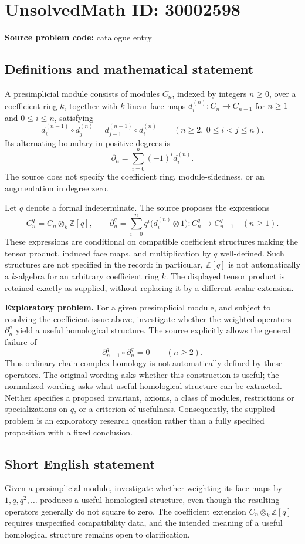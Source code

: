 \documentclass[11pt]{article}
\begin{document}
\section*{UnsolvedMath ID: 30002598}
\textbf{Source problem code:} catalogue entry
\subsection{Definitions and mathematical statement}
A presimplicial module consists of modules \(C_n\), indexed by integers \(n\geq 0\), over a coefficient ring \(k\), together with \(k\)-linear face maps \(d_i^{(n)}:C_n\to C_{n-1}\) for \(n\geq 1\) and \(0\leq i\leq n\), satisfying
\[
 d_i^{(n-1)}\circ d_j^{(n)}=d_{j-1}^{(n-1)}\circ d_i^{(n)}
 \qquad(n\geq 2,\ 0\leq i<j\leq n).
\]
Its alternating boundary in positive degrees is
\[
 \partial_n=\sum_{i=0}^{n}(-1)^i d_i^{(n)}.
\]
The source does not specify the coefficient ring, module-sidedness, or an augmentation in degree zero.

Let \(q\) denote a formal indeterminate. The source proposes the expressions
\[
 C_n^q=C_n\otimes_k\mathbb Z[q],\qquad
 \partial_n^q=\sum_{i=0}^{n}q^i\bigl(d_i^{(n)}\otimes 1\bigr):C_n^q\longrightarrow C_{n-1}^q
 \quad(n\geq 1).
\]
These expressions are conditional on compatible coefficient structures making the tensor product, induced face maps, and multiplication by \(q\) well-defined. Such structures are not specified in the record: in particular, \(\mathbb Z[q]\) is not automatically a \(k\)-algebra for an arbitrary coefficient ring \(k\). The displayed tensor product is retained exactly as supplied, without replacing it by a different scalar extension.

\textbf{Exploratory problem.} For a given presimplicial module, and subject to resolving the coefficient issue above, investigate whether the weighted operators \(\partial_n^q\) yield a useful homological structure. The source explicitly allows the general failure of
\[
 \partial_{n-1}^q\circ\partial_n^q=0\qquad(n\geq 2).
\]
Thus ordinary chain-complex homology is not automatically defined by these operators. The original wording asks whether this construction is useful; the normalized wording asks what useful homological structure can be extracted. Neither specifies a proposed invariant, axioms, a class of modules, restrictions or specializations on \(q\), or a criterion of usefulness. Consequently, the supplied problem is an exploratory research question rather than a fully specified proposition with a fixed conclusion.
\subsection{Short English statement}
Given a presimplicial module, investigate whether weighting its face maps by \(1,q,q^2,\ldots\) produces a useful homological structure, even though the resulting operators generally do not square to zero. The coefficient extension \(C_n\otimes_k\mathbb Z[q]\) requires unspecified compatibility data, and the intended meaning of a useful homological structure remains open to clarification.
\end{document}
